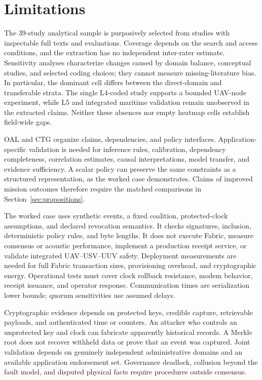 \documentclass[blockchains,review,accept,moreauthors]{Definitions/mdpi}
\begin{document}
\section{Limitations}\label{sec:limitations}

The 39-study analytical sample is purposively selected from studies with inspectable full texts and evaluations. Coverage depends on the search and access conditions, and the extraction has no independent inter-rater estimate. Sensitivity analyses characterize changes caused by domain balance, conceptual studies, and selected coding choices; they cannot measure missing-literature bias. In particular, the dominant cell differs between the direct-domain and transferable strata. The single L4-coded study supports a bounded UAV-node experiment, while L5 and integrated maritime validation remain unobserved in the extracted claims. Neither these absences nor empty heatmap cells establish field-wide gaps.

OAL and CTG organize claims, dependencies, and policy interfaces. Application-specific validation is needed for inference rules, calibration, dependency completeness, correlation estimates, causal interpretations, model transfer, and evidence sufficiency. A scalar policy can preserve the same constraints as a structured representation, as the worked case demonstrates. Claims of improved mission outcomes therefore require the matched comparisons in Section~\ref{sec:propositions}.

The worked case uses synthetic events, a fixed coalition, protected-clock assumptions, and declared revocation semantics. It checks signatures, inclusion, deterministic policy rules, and byte lengths. It does not execute Fabric, measure consensus or acoustic performance, implement a production receipt service, or validate integrated UAV--USV--UUV safety. Deployment measurements are needed for full Fabric transaction sizes, provisioning overhead, and cryptographic energy. Operational tests must cover clock rollback resistance, modem behavior, receipt issuance, and operator response. Communication times are serialization lower bounds; quorum sensitivities use assumed delays.

Cryptographic evidence depends on protected keys, credible capture, retrievable payloads, and authenticated time or counters. An attacker who controls an unprotected key and clock can fabricate apparently historical records. A Merkle root does not recover withheld data or prove that an event was captured. Joint validation depends on genuinely independent administrative domains and an available application endorsement set. Governance deadlock, collusion beyond the fault model, and disputed physical facts require procedures outside consensus.
\end{document}
